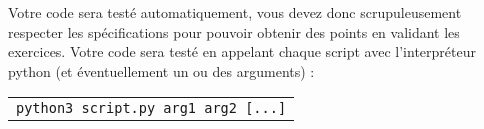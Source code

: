 



\noindent Votre code sera testé automatiquement, vous devez donc scrupuleusement respecter les spécifications pour pouvoir obtenir des points en validant les exercices.
Votre code sera testé en appelant chaque script avec l'interpréteur python (et éventuellement un ou des arguments) :

\medskip

\begin{tabular}{l}
\texttt{python3 script.py arg1 arg2 [...]}\\
\end{tabular}

\bigskip


